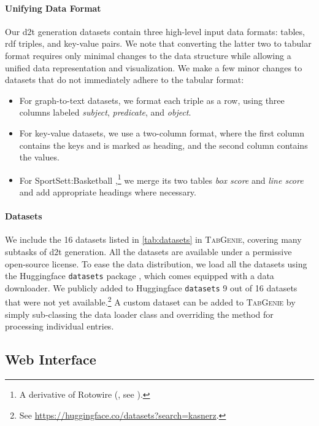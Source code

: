 \paragraph{Unifying Data Format} Our \ac{d2t} generation datasets contain three high-level input data formats: tables, \acs{rdf} triples, and key-value pairs. We note that converting the latter two to tabular format requires only minimal changes to the data structure while allowing a unified data representation and visualization. We make a few minor changes to datasets that do not immediately adhere to the tabular format:

\begin{itemize}
    \item For graph-to-text datasets, we format each triple as a row, using three columns labeled \textit{subject}, \textit{predicate}, and \textit{object}.
    \item For key-value datasets, we use a two-column format, where the first column contains the keys and is marked as heading, and the second column contains the values.
    \item For SportSett:Basketball \cite{thomson2020sportsett},\footnote{A derivative of Rotowire (\citealp{wiseman2017challenges}, see ).} we merge its two tables \textit{box score} and \textit{line score} and add appropriate headings where necessary.
\end{itemize}


\paragraph{Datasets}
We include the 16 datasets listed in \autoref{tab:datasets} in \textsc{TabGenie}, covering many subtasks of \ac{d2t} generation. All the datasets are available under a permissive open-source license. To ease the data distribution, we load all the datasets using the Huggingface \texttt{datasets} package \cite{lhoest2021datasets}, which comes equipped with a data downloader. We publicly added to Huggingface \texttt{datasets} 9 out of 16 datasets that were not yet available.\footnote{See \url{https://huggingface.co/datasets?search=kasnerz}.} A custom dataset can be added to \textsc{TabGenie} by simply sub-classing the data loader class and overriding the method for processing individual entries.

\subsection{Web Interface}
\label{sec:tabgenie:web}


